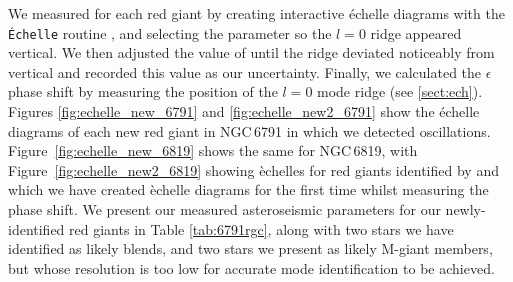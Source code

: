 
We measured \dnu{} for each red giant by creating interactive \'echelle diagrams with the \texttt{\'Echelle} routine \citep{daniel_hey_echelle_2020}, and selecting the \dnu{} parameter so the $l = 0$ ridge appeared vertical. We then adjusted the value of \dnu{} until the ridge deviated noticeably from vertical and recorded this value as our uncertainty. Finally, we calculated the $\epsilon$ phase shift by measuring the position of the $l = 0$ mode ridge (see \cref{sect:ech}). Figures \ref{fig:echelle_new_6791} and \ref{fig:echelle_new2_6791} show the \'echelle diagrams of each new red giant in NGC\,6791 in which we detected oscillations. Figure~\ref{fig:echelle_new_6819} shows the same for NGC\,6819, with Figure~\ref{fig:echelle_new2_6819} showing \`echelles for red giants identified by \cite{bellamy_using_2015} and which we have created \`echelle diagrams for the first time whilst measuring the phase shift. We present our measured asteroseismic parameters for our newly-identified red giants in Table \ref{tab:6791rgc}, along with two stars we have identified as likely blends, and two stars we present as likely M-giant members, but whose resolution is too low for accurate mode identification to be achieved.



